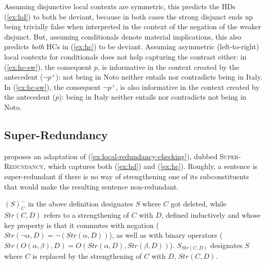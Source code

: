 Assuming disjunctive local contexts are symmetric, this predicts the HDs (\ref{ex:hd}) to both be deviant, because in both cases the strong disjunct ends up being trivially false when interpreted in the context of the negation of the weaker disjunct. But, assuming conditionals denote material implications, this also predicts \textit{both} HCs in (\ref{ex:hc}) to be deviant. Assuming asymmetric (left-to-right) local contexts for conditionals does not help capturing the contrast either: in (\ref{ex:hc-sw}), the consequent $p$, is informative in the context created by the antecedent ($\neg p^+$): not being in Noto neither entails nor contradicts being in Italy. In (\ref{ex:hc-sw}), the consequent $\neg p^+$, is also informative in the context created by the antecedent ($p$): being in Italy neither entails nor contradicts not being in Noto. 

\fi

\subsection{Super-Redundancy}
\citet{Kalomoiros2024} proposes an adaptation of (\ref{ex:local-redundancy-checking}), dubbed \textsc{Super-Redundancy}, which captures both (\ref{ex:hd}) and (\ref{ex:hc}). Roughly, a sentence is super-redundant if there is no way of strengthening one of its subconstituents that would make the resulting sentence non-redundant.


\begin{exe}
\end{exe}
$(S)^-_C$ in the above definition designates $S$ where $C$ got deleted, while $Str(C, D)$ refers to a strengthening of $C$ with $D$, defined inductively and whose key property is that it commutes with negation ($Str(\neg\alpha, D) = \neg (Str(\alpha, D))$), as well as with binary operators ($Str(O(\alpha, \beta), D) = O(Str(\alpha, D), Str(\beta, D))$). $S_{Str(C, D)}$ designates $S$ where $C$ is replaced by the strengthening of $C$ with $D$, $Str(C, D)$.\\

